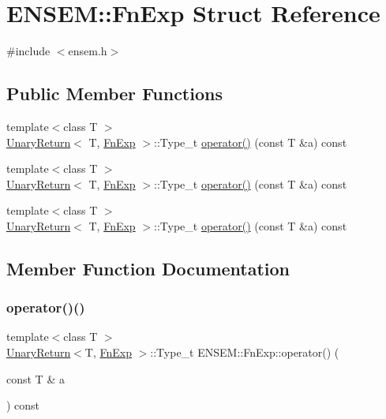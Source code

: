 \hypertarget{structENSEM_1_1FnExp}{}\section{E\+N\+S\+EM\+:\+:Fn\+Exp Struct Reference}
\label{structENSEM_1_1FnExp}


{\ttfamily \#include $<$ensem.\+h$>$}

\subsection*{Public Member Functions}
\begin{DoxyCompactItemize}
\item 
{\footnotesize template$<$class T $>$ }\\\mbox{\hyperlink{structENSEM_1_1UnaryReturn}{Unary\+Return}}$<$ T, \mbox{\hyperlink{structENSEM_1_1FnExp}{Fn\+Exp}} $>$\+::Type\+\_\+t \mbox{\hyperlink{structENSEM_1_1FnExp_a10f95f4422549fc30c1eacde6618fdcf}{operator()}} (const T \&a) const
\item 
{\footnotesize template$<$class T $>$ }\\\mbox{\hyperlink{structENSEM_1_1UnaryReturn}{Unary\+Return}}$<$ T, \mbox{\hyperlink{structENSEM_1_1FnExp}{Fn\+Exp}} $>$\+::Type\+\_\+t \mbox{\hyperlink{structENSEM_1_1FnExp_a10f95f4422549fc30c1eacde6618fdcf}{operator()}} (const T \&a) const
\item 
{\footnotesize template$<$class T $>$ }\\\mbox{\hyperlink{structENSEM_1_1UnaryReturn}{Unary\+Return}}$<$ T, \mbox{\hyperlink{structENSEM_1_1FnExp}{Fn\+Exp}} $>$\+::Type\+\_\+t \mbox{\hyperlink{structENSEM_1_1FnExp_a10f95f4422549fc30c1eacde6618fdcf}{operator()}} (const T \&a) const
\end{DoxyCompactItemize}


\subsection{Member Function Documentation}
\mbox{\label{structENSEM_1_1FnExp_a10f95f4422549fc30c1eacde6618fdcf}} 
\subsubsection{\texorpdfstring{operator()()}{operator()()}\hspace{0.1cm}{\footnotesize\ttfamily [1/3]}}
{\footnotesize\ttfamily template$<$class T $>$ \\
\mbox{\hyperlink{structENSEM_1_1UnaryReturn}{Unary\+Return}}$<$T, \mbox{\hyperlink{structENSEM_1_1FnExp}{Fn\+Exp}} $>$\+::Type\+\_\+t E\+N\+S\+E\+M\+::\+Fn\+Exp\+::operator() (\begin{DoxyParamCaption}\item[{const T \&}]{a }\end{DoxyParamCaption}) const\hspace{0.3cm}{\ttfamily [inline]}}

